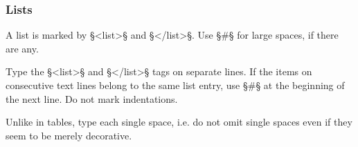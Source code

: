 \documentclass[fontsize=11pt, paper=a4, 
DIV15,
headings=normal,
parskip=half-, 
numbers=noenddot]{scrartcl}
\begin{document}
\subsubsection{Lists}
\label{section chinese lists}


\begin{mainrule}
A list is marked by §<list>§ and §</list>§. Use §#§ for large spaces, if there are any.
\end{mainrule}

\begin{clarification}
Type the §<list>§ and §</list>§ tags on separate lines. If the items on consecutive text lines belong to the same list entry, use §#§ at the beginning of the next line. Do not mark indentations. 
\end{clarification}

\begin{clarification}
Unlike in tables, type each single space, i.e. do not omit single spaces even if they seem to be merely decorative.
\end{clarification}
\end{document}
